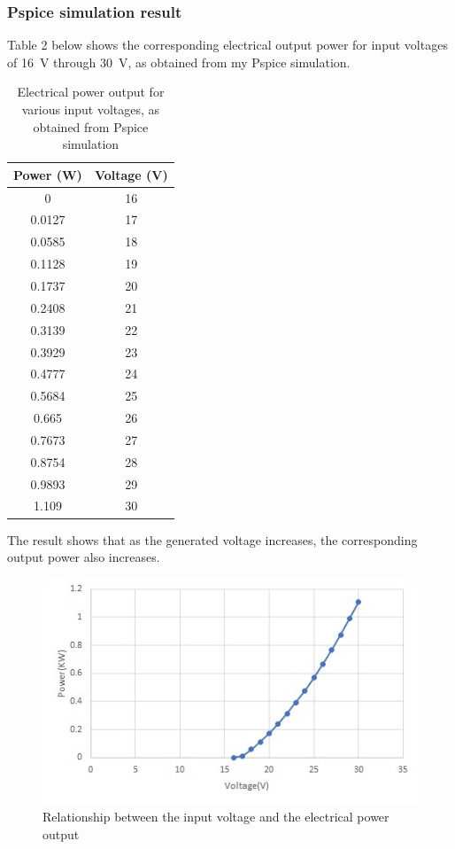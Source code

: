 \documentclass[titlepage]{article}
\begin{document}
\subsubsection{Pspice simulation result}
Table 2 below shows the corresponding electrical output power for input voltages of 16~V through 30~V, as obtained from my Pspice simulation. 
\begin{table}[h!]
\centering
\begin{tabular}{ |c|c|} 
 \hline
 Power (W) & Voltage (V)\\
\hline
0 &	16\\
0.0127 & 17\\
0.0585 & 18\\
0.1128 & 19\\
0.1737 & 20\\
0.2408 & 21\\
0.3139 & 22\\
0.3929 & 23\\
0.4777 & 24\\
0.5684 & 25\\
0.665  & 26\\
0.7673 & 27\\
0.8754 & 28\\
0.9893 & 29\\
1.109  & 30\\
 \hline
\end{tabular}
\caption{Electrical power output for various input voltages, as obtained from Pspice simulation}
\label{table:1}
\end{table}

The result shows that as the generated voltage increases, the corresponding output power also increases.
\begin{figure}[h!]
\centering
\includegraphics[scale=0.8]{voltageVSpower.jpg}
\caption{Relationship between the input voltage and the electrical power output}
\label{voltageVSpower}
\end{figure}
\end{document}
